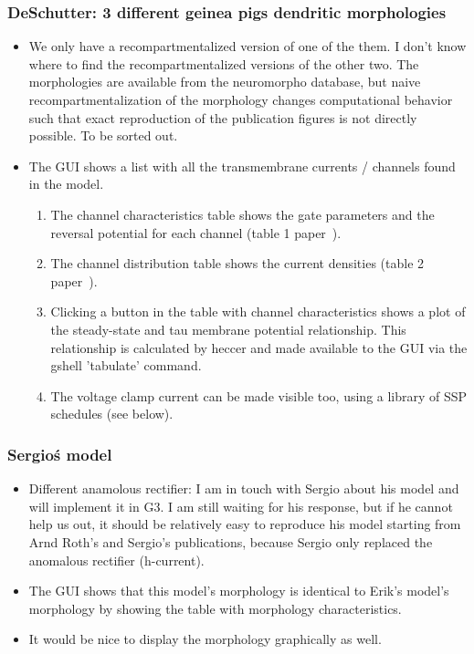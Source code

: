 \documentclass[12pt]{article}
\begin{document}
\subsubsection{DeSchutter: 3 different geinea pigs dendritic morphologies}
\begin{itemize}
\item We only have a recompartmentalized version of one of the them.
  I don't know where to find the recompartmentalized versions of the
  other two.  The morphologies are available from the neuromorpho
  database, but naive recompartmentalization of the morphology changes
  computational behavior such that exact reproduction of the
  publication figures is not directly possible.  To be sorted out.
\item The GUI shows a list with all the transmembrane currents /
  channels found in the model.
  \begin{enumerate}
  \item The channel characteristics table shows the gate parameters
    and the reversal potential for each channel (table 1
    paper~\cite{deschutter94:_purkin_i}).
  \item The channel distribution table shows the current densities
    (table 2 paper~\cite{deschutter94:_purkin_i}).
  \item Clicking a button in the table with channel characteristics
    shows a plot of the steady-state and tau membrane potential
    relationship.  This relationship is calculated by heccer and made
    available to the GUI via the gshell 'tabulate' command.
  \item The voltage clamp current can be made visible too, using a
    library of SSP schedules (see below).
  \end{enumerate}
\end{itemize}


\subsubsection{Sergio\'s model}
\begin{itemize}
\item Different anamolous rectifier: I am in touch with Sergio about
  his model and will implement it in G3.  I am still waiting for his
  response, but if he cannot help us out, it should be relatively easy
  to reproduce his model starting from Arnd Roth's and Sergio's
  publications, because Sergio only replaced the anomalous rectifier
  (h-current).
\item The GUI shows that this model's morphology is identical to
  Erik's model's morphology by showing the table with morphology
  characteristics.
\item It would be nice to display the morphology graphically as well.
\end{itemize}
\end{document}
